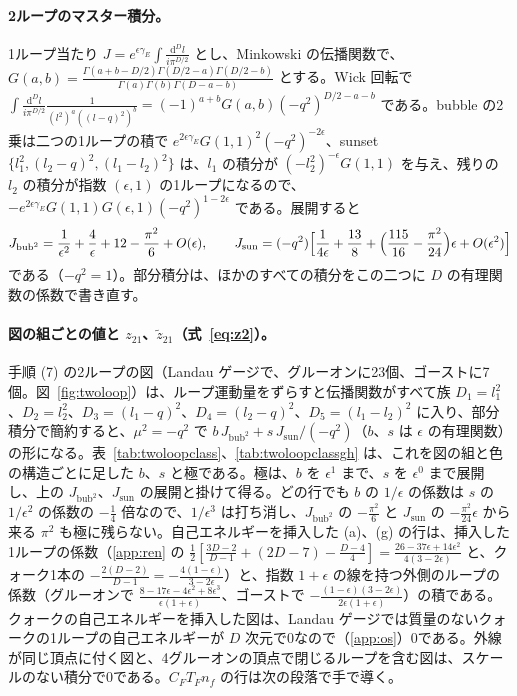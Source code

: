 \documentclass[a4paper,10pt]{ltjsarticle}
\newcommand{\dd}{\mathrm{d}}
\begin{document}
\paragraph{2ループのマスター積分。}1ループ当たり $J=e^{\epsilon\gamma_E}\int\frac{\dd^Dl}{i\pi^{D/2}}$ とし、Minkowski の伝播関数で、$G(a,b)=\frac{\Gamma(a+b-D/2)\Gamma(D/2-a)\Gamma(D/2-b)}{\Gamma(a)\Gamma(b)\Gamma(D-a-b)}$ とする。Wick 回転で $\int\frac{\dd^Dl}{i\pi^{D/2}}\frac{1}{(l^2)^a((l-q)^2)^b}=(-1)^{a+b}G(a,b)(-q^2)^{D/2-a-b}$ である。bubble の2乗は二つの1ループの積で $e^{2\epsilon\gamma_E}G(1,1)^2(-q^2)^{-2\epsilon}$、sunset $\{l_1^2,(l_2-q)^2,(l_1-l_2)^2\}$ は、$l_1$ の積分が $(-l_2^2)^{-\epsilon}G(1,1)$ を与え、残りの $l_2$ の積分が指数 $(\epsilon,1)$ の1ループになるので、$-e^{2\epsilon\gamma_E}G(1,1)G(\epsilon,1)(-q^2)^{1-2\epsilon}$ である。展開すると
\begin{equation*}
J_{\mathrm{bub}^2}=\frac1{\epsilon^2}+\frac4\epsilon+12-\frac{\pi^2}6+O(\epsilon),\qquad
J_{\mathrm{sun}}=(-q^2)\Bigl[\frac1{4\epsilon}+\frac{13}8+\Bigl(\frac{115}{16}-\frac{\pi^2}{24}\Bigr)\epsilon+O(\epsilon^2)\Bigr]
\end{equation*}
である（$-q^2=1$）。部分積分は、ほかのすべての積分をこの二つに $D$ の有理関数の係数で書き直す。

\paragraph{図の組ごとの値と $z_{21}$、$\tilde z_{21}$（式~\eqref{eq:z2}）。}手順 (7) の2ループの図（Landau ゲージで、グルーオンに23個、ゴーストに7個。図~\ref{fig:twoloop}）は、ループ運動量をずらすと伝播関数がすべて族 $D_1=l_1^2$、$D_2=l_2^2$、$D_3=(l_1-q)^2$、$D_4=(l_2-q)^2$、$D_5=(l_1-l_2)^2$ に入り、部分積分で簡約すると、$\mu^2=-q^2$ で $b\,J_{\mathrm{bub}^2}+s\,J_{\mathrm{sun}}/(-q^2)$（$b$、$s$ は $\epsilon$ の有理関数）の形になる。表~\ref{tab:twoloopclass}、\ref{tab:twoloopclassgh} は、これを図の組と色の構造ごとに足した $b$、$s$ と極である。極は、$b$ を $\epsilon^1$ まで、$s$ を $\epsilon^0$ まで展開し、上の $J_{\mathrm{bub}^2}$、$J_{\mathrm{sun}}$ の展開と掛けて得る。どの行でも $b$ の $1/\epsilon$ の係数は $s$ の $1/\epsilon^2$ の係数の $-\frac14$ 倍なので、$1/\epsilon^3$ は打ち消し、$J_{\mathrm{bub}^2}$ の $-\frac{\pi^2}6$ と $J_{\mathrm{sun}}$ の $-\frac{\pi^2}{24}\epsilon$ から来る $\pi^2$ も極に残らない。自己エネルギーを挿入した (a)、(g) の行は、挿入した1ループの係数（\ref{app:ren} の $\frac12[\frac{3D-2}{D-1}+(2D-7)-\frac{D-4}4]=\frac{26-37\epsilon+14\epsilon^2}{4(3-2\epsilon)}$ と、クォーク1本の $-\frac{2(D-2)}{D-1}=-\frac{4(1-\epsilon)}{3-2\epsilon}$）と、指数 $1+\epsilon$ の線を持つ外側のループの係数（グルーオンで $\frac{8-17\epsilon-4\epsilon^2+8\epsilon^3}{\epsilon(1+\epsilon)}$、ゴーストで $-\frac{(1-\epsilon)(3-2\epsilon)}{2\epsilon(1+\epsilon)}$）の積である。クォークの自己エネルギーを挿入した図は、Landau ゲージでは質量のないクォークの1ループの自己エネルギーが $D$ 次元で0なので（\ref{app:os}）0である。外線が同じ頂点に付く図と、4グルーオンの頂点で閉じるループを含む図は、スケールのない積分で0である。$C_FT_Fn_f$ の行は次の段落で手で導く。
\end{document}
